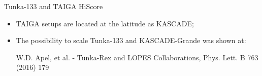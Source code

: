 
%

\begin{frame}{Tunka-133 and TAIGA HiScore}
% 
\begin{itemize}
 \item TAIGA setups are located at the latitude as KASCADE;
 \item The possibility to scale  Tunka-133 and KASCADE-Grande was shown at:

W.D. Apel, et al. - Tunka-Rex and LOPES Collaborations, Phys. Lett. B 763 (2016) 179
\end{itemize}
\end{frame}


